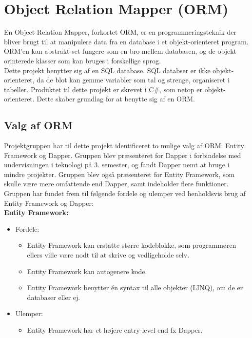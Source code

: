 \section{Object Relation Mapper (ORM)}\label{sec:orm}
En Object Relation Mapper, forkortet ORM, er en programmeringsteknik der bliver brugt til
at manipulere data fra en database i et objekt-orienteret program. ORM'en kan abstrakt set fungere som en bro mellem databasen, og de objekt orinterede klasser som kan bruges i forskellige sprog.   
\\

Dette projekt benytter sig af en SQL database. SQL databser er ikke objekt-orienteret, da de
blot kan gemme variabler som tal og strenge, organiseret i tabeller. Produktet til dette projekt
er skrevet i C\#, som netop er objekt-orienteret. Dette skaber grundlag for at benytte sig af en
ORM. 

\subsection{Valg af ORM}\label{dapper}
Projektgruppen har til dette projekt identificeret to mulige valg af ORM: Entity Framework og Dapper.
Gruppen blev præsenteret for Dapper i forbindelse med undervisningen i teknologi på 3. semester, og fandt Dapper
nemt at bruge i mindre projekter. Gruppen blev også præsenteret for Entity Framework, som skulle være mere omfattende
end Dapper, samt indeholder flere funktioner. \\ 
Gruppen har fundet frem til følgende fordele og ulemper ved henholdsvis brug af Entity Framework og Dapper: \\

\textbf{Entity Framework:}
\begin{itemize}
    \item Fordele:
    \begin{itemize}
        \item Entity Framework kan erstatte større kodeblokke, som programmøren ellers ville være nodt til at skrive og vedligeholde selv.
        \item Entity Framework kan autogenere kode.
        \item Entity Framework benytter én syntax til alle objekter (LINQ), om de er databaser eller ej.
    \end{itemize}
    \item Ulemper:
    \begin{itemize}
        \item Entity Framework har et højere entry-level end fx Dapper.
    \end{itemize}
\end{itemize}


